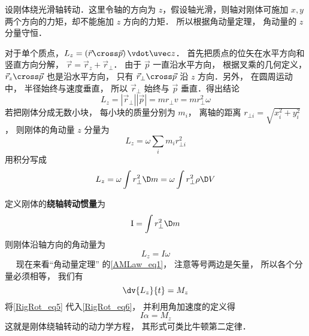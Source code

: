 

设刚体绕光滑轴转动．这里令轴的方向为 $z$，假设轴光滑，则轴对刚体可施加 $x, y$ 两个方向的力矩，却不能施加 $z$ 方向的力矩． 所以根据角动量定理， 角动量的 $z$ 分量守恒．

对于单个质点，${L_z} = \left( {\vec r \cross \vec p} \right) \vdot \uvec z$． 首先把质点的位矢在水平方向和竖直方向分解， $\vec r = {\vec r_z} + {\vec r_ \bot }$． 由于 $\vec p$ 一直沿水平方向， 根据叉乘的几何定义， ${\vec r_z} \cross \vec p$ 也是沿水平方向， 只有 ${\vec r_ \bot } \cross \vec p$ 沿 $z$ 方向．另外， 在圆周运动中， 半径始终与速度垂直， 所以 ${\vec r_ \bot }$ 始终与 $\vec p$ 垂直．得出结论
\begin{equation}
{L_z} = \left| {{{\vec r}_ \bot }} \right|\left| {\vec p} \right| = m{r_ \bot }v = mr_ \bot ^2\omega 
\end{equation}
若把刚体分成无数小块， 每小块的质量分别为 $m_i$， 离轴的距离 ${r_{ \bot i}} = \sqrt {x_i^2 + y_i^2} $， 则刚体的角动量 $z$ 分量为
\begin{equation}
{L_z} = \omega \sum\limits_i {{m_i}r_{ \bot i}^2} 
\end{equation}
用积分写成
\begin{equation}
{L_z} = \omega \int {r_ \bot ^2\D m} = \omega \int {r_ \bot ^2\rho  \D V} 
\end{equation}

定义刚体的\textbf{绕轴转动惯量}为
\begin{equation}
{\rm{I}} = \int {r_ \bot ^2\D m} 
\end{equation}
则刚体沿轴方向的角动量为
\begin{equation}\label{RigRot_eq5}
{L_z} = I\omega 
\end{equation}
 
现在来看“角动量定理” 的\autoref{AMLaw_eq1}， 注意等号两边是矢量， 所以各个分量必须相等， 我们有
\begin{equation}\label{RigRot_eq6}
\dv{L_z}{t} = M_z
\end{equation}
将\autoref{RigRot_eq5} 代入\autoref{RigRot_eq6}， 并利用角加速度的定义得
\begin{equation}
I\alpha = M_z
\end{equation}
这就是刚体绕轴转动的动力学方程， 其形式可类比牛顿第二定律．











